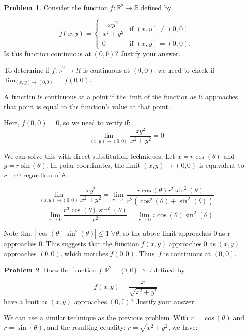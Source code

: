\documentclass[12]{amsart}
\theoremstyle{definition}
\newtheorem{xca}{Problem}
\newcommand{\R}{\mathbb{R}}
\newcommand{\sskip}{\newpage}
\begin{document}
\sskip

\begin{xca}%
Consider the function $f:\mathbb R^2\to \mathbb R$ defined by

$$
f(x,y)=
\begin{cases}
\dfrac{xy^2}{x^2+y^2} &\text{if $(x,y)\neq(0,0)$}\\
0 &\text{if $(x,y)=(0,0)$}.
\end{cases}
$$
Is this function continuous at $(0,0)$? Justify your answer.

\end{xca}

To determine if $f : \R^2 \to R$ is continuous at $(0, 0)$,
we need to check if $\lim_{(x,y) \to (0, 0)} = f(0, 0)$.

A function is continuous at a point if the limit of the function as it approaches
that point is equal to the function's value at that point.

Here, $f(0, 0) = 0$, so we need to verify if:
\[\lim_{(x, y) \to (0, 0)} \frac{x y^2}{x^2 + y^2} = 0\]

We can solve this with direct substitution techniques.
Let $x = r \cos(\theta)$ and $y = r \sin(\theta)$. In polar coordinates,
the limit $(x, y) \to (0, 0)$ is equivalent to $r \to 0$ regardless of $\theta$.

\[\lim_{(x, y) \to (0, 0)} \frac{x y^2}{x^2 + y^2} = \lim_{r \to 0} \frac{r \cos(\theta) r^2 \sin^2(\theta)}{r^2 (\cos^2(\theta) + \sin^2(\theta))}\]
\[= \lim_{r \to 0} \frac{r^3 \cos(\theta) \sin^2(\theta)}{r^2} = \lim_{r \to 0} r \cos(\theta) \sin^2(\theta)\]

Note that $|\cos(\theta) \sin^2(\theta)| \leq 1$ $\forall \theta$, so the above limit
approaches 0 as r approaches 0. This suggests that the function $f(x, y)$
approaches 0 as $(x, y)$ approaches $(0, 0)$, which matches $f(0, 0)$.
Thus, $f$ is continuous at $(0, 0)$.


\sskip

\begin{xca} %
Does the function $f:\mathbb R^2-\{0,0\}\to \mathbb R$ defined by

$$
f(x,y)=\frac{x}{\sqrt{x^2+y^2}}
$$
have a limit as $(x,y)$ approaches $(0,0)$? Justify your answer.

\end{xca}

We can use a similar technique as the previous problem.
With $r = \cos(\theta)$ and $r = \sin(\theta)$, and the resulting equality:
$r = \sqrt{x^2 + y^2}$, we have:
\end{document}
